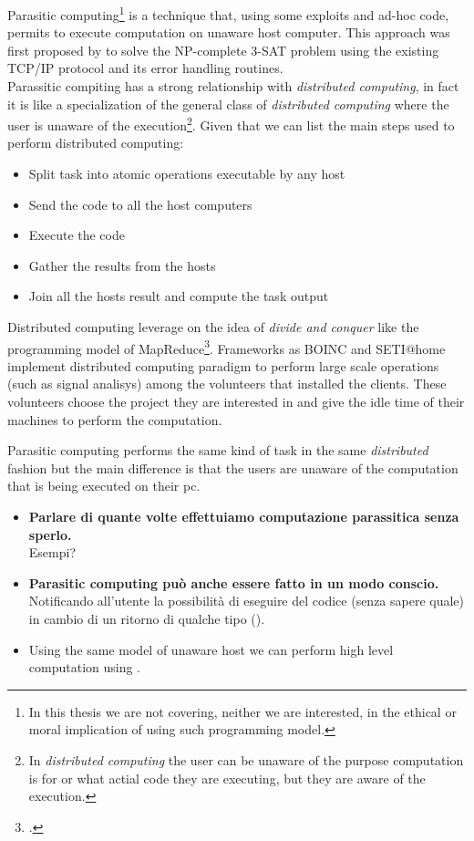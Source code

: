 
Parasitic computing\footnote{In this thesis we are not covering, neither
we are interested, in the ethical or moral implication of using such programming model.}
is a technique that, using some exploits and ad-hoc code,
permits to execute computation on unaware host computer. This approach was first
proposed by \cite{barabasi2001parasitic} to solve the NP-complete 3-SAT problem
using the existing TCP/IP protocol and its error handling routines.\\


Parassitic compiting has a strong relationship with \emph{distributed computing}, in
fact it is like a specialization of the general class of \emph{distributed computing}
where the user is unaware of the execution\footnote{In \emph{distributed computing}
the user can be unaware of the purpose computation is for or what actial code they are
executing, but they are aware of the execution.}.
Given that we can list the main steps used to perform distributed computing:
\begin{itemize}
	\item Split task into atomic operations executable by any host
	\item Send the code to all the host computers
	\item Execute the code
	\item Gather the results from the hosts
	\item Join all the hosts result and compute the task output
\end{itemize}

Distributed computing leverage on the idea of \emph{divide and conquer} like the
programming model of MapReduce\footcite{dean2008mapreduce}. Frameworks as
\ac{BOINC} and \ac{SETI@home} implement distributed computing paradigm to perform large
scale operations (such as signal analisys) among the volunteers that installed the
clients. These volunteers choose the project they are interested in and give the
idle time of their machines to perform the computation.

Parasitic computing performs the same kind of task in the same \emph{distributed} fashion
but the main difference is that the users are unaware of the computation that is being
executed on their pc.

\begin{itemize}
	\item \textbf{Parlare di quante volte effettuiamo computazione parassitica senza sperlo.}\\Esempi?

	\item \textbf{Parasitic computing può anche essere fatto in un modo conscio.} Notificando
	all'utente la possibilità di eseguire del codice (senza sapere quale) in cambio di un ritorno di qualche
	tipo (\cite{karame2011pay}).

	\item Using the same model of unaware host we can perform high level computation using
	\js{}.
\end{itemize}

